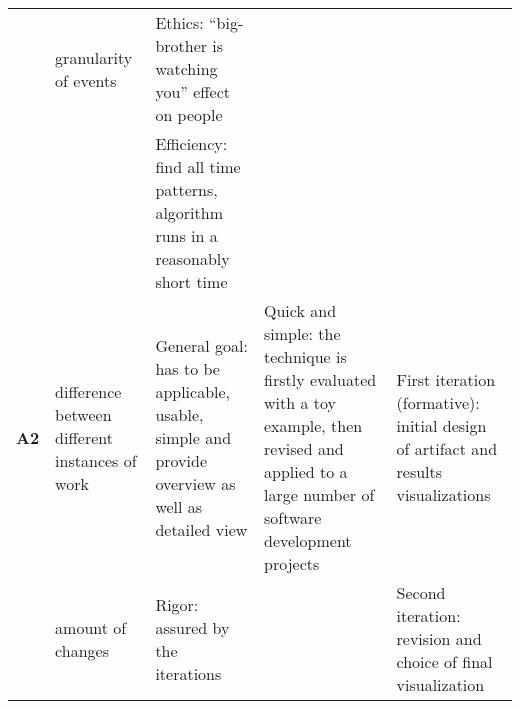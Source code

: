\begin{longtable}[c]{@{}p{1.2cm}p{2.5cm}p{5cm}p{3cm}p{4cm}@{}}
                  & granularity of events                          & Ethics: “big-brother is watching you” effect on people                                                                                                                                                                                                                   &                                                                                                                                                      &                                                                                                                               \\
                  &                                                & Efficiency: find all time patterns, algorithm runs in a reasonably short time                                                                                                                                                                                            &                                                                                                                                                      &                                                                                                                               \\* \midrule
\textbf{A2}       & difference between different instances of work & General goal: has to be applicable, usable, simple and provide overview as well as detailed view                                                                                                                                                                         & Quick and simple: the technique is firstly evaluated with a toy example, then revised and applied to a large number of software development projects & First iteration (formative): initial design of artifact and results  visualizations                                           \\
                  & amount of changes                              & Rigor: assured by the iterations                                                                                                                                                                                                                                         &                                                                                                                                                      & Second iteration: revision and choice of final visualization                                                                  \\

\end{longtable}
